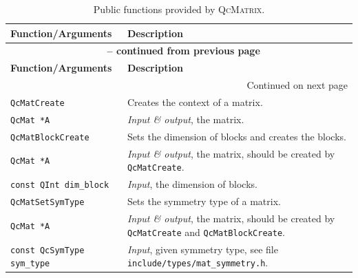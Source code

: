 \documentclass[a4paper,11pt,twoside,openright]{book}
\begin{document}
\begin{center}
  \small
  \begin{longtable}{l|p{}}
    \caption{Public functions provided by \textsc{QcMatrix}.}
    \label{tab-QcMat-public-fun}\\
    \hline\hline
    \textbf{Function/Arguments} & \textbf{Description}\\
    \hline
    \endfirsthead
    \multicolumn{2}{c}{{\bfseries \tablename\ \thetable{} -- continued from previous page}}\\
    \hline\hline
    \textbf{Function/Arguments} & \textbf{Description}\\
    \hline
    \endhead
    \hline
    \multicolumn{2}{r}{Continued on next page}\\
    \hline
    \endfoot
    \hline\hline
    \endlastfoot
%
    \verb|QcMatCreate|\index{\texttt{QcMatCreate}} %
      & Creates the context of a matrix.\\
    \hspace*{2ex}\verb|QcMat *A| %
      & \textsl{Input \& output}, the matrix.\\
    \hline
%
    \verb|QcMatBlockCreate|\index{\texttt{QcMatBlockCreate}} %
      & Sets the dimension of blocks and creates the blocks.\\
    \hspace*{2ex}\verb|QcMat *A| %
      & \textsl{Input \& output}, the matrix, should be created by \verb|QcMatCreate|.\\
    \hspace*{2ex}\verb|const QInt dim_block| %
      & \textsl{Input}, the dimension of blocks.\\
    \hline
%
    \verb|QcMatSetSymType|\index{\texttt{QcMatSetSymType}} %
      & Sets the symmetry type of a matrix.\\
    \hspace*{2ex}\verb|QcMat *A| %
      & \textsl{Input \& output}, the matrix, should be created by \verb|QcMatCreate|
        and \verb|QcMatBlockCreate|.\\
    \hspace*{2ex}\verb|const QcSymType sym_type| %
      & \textsl{Input}, given symmetry type, see file \verb|include/types/mat_symmetry.h|.\\

\end{longtable}
\end{center}
\end{document}
